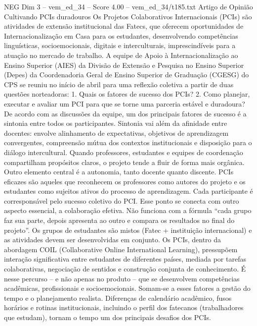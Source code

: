 \begin{textsample}{NEG Dim 3 – vem\_ed\_34 – Score 4.00 – vem\_ed\_34/t185.txt}  \label{ex:f3_neg_124}
Artigo de Opinião Cultivando PCIs duradouros Os Projetos Colaborativos Internacionais (PCIs) são atividades de extensão institucional das Fatecs, que oferecem oportunidades de Internacionalização em Casa para os estudantes, desenvolvendo competências linguísticas, socioemocionais, digitais e interculturais, imprescindíveis para a atuação no mercado de trabalho.
A equipe de Apoio à Internacionalização ao Ensino Superior (AIES) da Divisão de Extensão e Pesquisa no Ensino Superior (Depes) da Coordenadoria Geral de Ensino Superior de Graduação (CGESG) do CPS se reuniu no início de abril para uma reflexão coletiva a partir de duas questões norteadoras: 1.
Quais os fatores de sucesso dos PCIs? 2.
Como planejar, executar e avaliar um PCI para que se torne uma parceria estável e duradoura?
De acordo com as discussões da equipe, um dos principais fatores de sucesso é a sintonia entre todos os participantes.
Sintonia vai além da afinidade entre docentes: envolve alinhamento de expectativas, objetivos de aprendizagem convergentes, compreensão mútua dos contextos institucionais e disposição para o diálogo intercultural.
Quando professores, estudantes e equipes de coordenação compartilham propósitos claros, o projeto tende a fluir de forma mais orgânica.
Outro elemento central é a autonomia, tanto docente quanto discente.
PCIs eficazes são aqueles que reconhecem os professores como autores do projeto e os estudantes como sujeitos ativos do processo de aprendizagem.
Cada participante é corresponsável pelo sucesso coletivo do PCI.
Esse ponto se conecta com outro aspecto essencial, a colaboração efetiva.
Não funciona com a fórmula “cada grupo faz sua parte, depois apresenta ao outro e compara os resultados no final do projeto”.
Os grupos de estudantes são mistos (Fatec + instituição internacional) e as atividades devem ser desenvolvidas em conjunto.
Os PCIs, dentro da abordagem COIL (Collaborative Online International Learning), pressupõem interação significativa entre estudantes de diferentes países, mediada por tarefas colaborativas, negociação de sentidos e construção conjunta de conhecimento.
É nesse percurso – e não apenas no produto – que se desenvolvem competências acadêmicas, profissionais e socioemocionais.
Somam-se a esses fatores a gestão do tempo e o planejamento realista.
Diferenças de calendário acadêmico, fusos horários e rotinas institucionais, incluindo o perfil dos fatecanos (trabalhadores que estudam), tornam o tempo um dos principais desafios dos PCIs.

\end{textsample}
